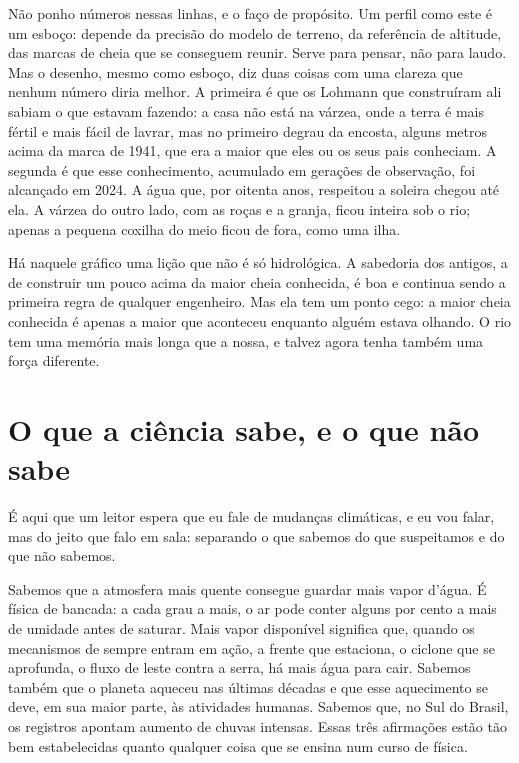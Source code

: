 \documentclass[
  brazilian,
  11pt,
  openany]{book}
\begin{document}
Não ponho números nessas linhas, e o faço de propósito. Um perfil como
este é um esboço: depende da precisão do modelo de terreno, da
referência de altitude, das marcas de cheia que se conseguem reunir.
Serve para pensar, não para laudo. Mas o desenho, mesmo como esboço, diz
duas coisas com uma clareza que nenhum número diria melhor. A primeira é
que os Lohmann que construíram ali sabiam o que estavam fazendo: a casa
não está na várzea, onde a terra é mais fértil e mais fácil de lavrar,
mas no primeiro degrau da encosta, alguns metros acima da marca de 1941,
que era a maior que eles ou os seus pais conheciam. A segunda é que esse
conhecimento, acumulado em gerações de observação, foi alcançado em
2024. A água que, por oitenta anos, respeitou a soleira chegou até ela.
A várzea do outro lado, com as roças e a granja, ficou inteira sob o
rio; apenas a pequena coxilha do meio ficou de fora, como uma ilha.

Há naquele gráfico uma lição que não é só hidrológica. A sabedoria dos
antigos, a de construir um pouco acima da maior cheia conhecida, é boa e
continua sendo a primeira regra de qualquer engenheiro. Mas ela tem um
ponto cego: a maior cheia conhecida é apenas a maior que aconteceu
enquanto alguém estava olhando. O rio tem uma memória mais longa que a
nossa, e talvez agora tenha também uma força diferente.

\section{O que a ciência sabe, e o que não
sabe}\label{o-que-a-ciuxeancia-sabe-e-o-que-nuxe3o-sabe}

É aqui que um leitor espera que eu fale de mudanças climáticas, e eu vou
falar, mas do jeito que falo em sala: separando o que sabemos do que
suspeitamos e do que não sabemos.

Sabemos que a atmosfera mais quente consegue guardar mais vapor d'água.
É física de bancada: a cada grau a mais, o ar pode conter alguns por
cento a mais de umidade antes de saturar. Mais vapor disponível
significa que, quando os mecanismos de sempre entram em ação, a frente
que estaciona, o ciclone que se aprofunda, o fluxo de leste contra a
serra, há mais água para cair. Sabemos também que o planeta aqueceu nas
últimas décadas e que esse aquecimento se deve, em sua maior parte, às
atividades humanas. Sabemos que, no Sul do Brasil, os registros apontam
aumento de chuvas intensas. Essas três afirmações estão tão bem
estabelecidas quanto qualquer coisa que se ensina num curso de física.
\end{document}

